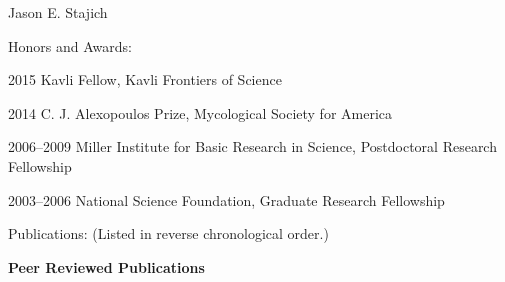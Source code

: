 \documentclass[10pt]{article}
\def\endthebibliography{\end{etaremune}}
\begin{document}
\begin{cv}{\centerline{Jason E. Stajich}}
\begin{cvlistcompact}{Honors and Awards:}
\item [2015] Kavli Fellow, Kavli Frontiers of Science
\item [2014] C. J. Alexopoulos Prize, Mycological Society for America
\item [2006--2009] Miller Institute for Basic Research in Science,
  Postdoctoral Research Fellowship
\item [2003--2006] National Science Foundation, Graduate Research Fellowship
\end{cvlistcompact}

\setlength{\oldcvlabelwidth}{\cvlabelwidth}
\setlength{\cvlabelwidth}{1em}
\renewcommand*{\bibindent}{1.5em}
\renewcommand*{\biblabelsep}{1.5em}

\begin{cvlist}{Publications: (Listed in reverse chronological order.)}
  \item \textbf{Peer Reviewed Publications}

\makeatletter
\def\thebibliography#1{\list
{\arabic{enumiv}.}{\settowidth\labelwidth{[#1]}\leftmargin\labelwidth
\advance\leftmargin\labelsep
\usecounter{enumiv}}
\def\newblock{\hskip .11em plus .33em minus .07em}
\sloppy\clubpenalty4000\widowpenalty4000
\sfcode`\.=1000\relax
}
\let\endthebibliography=\endlist
\makeatother


\def\mybibitem#1{\item}


\end{cvlist}
\end{cv}
\end{document}
